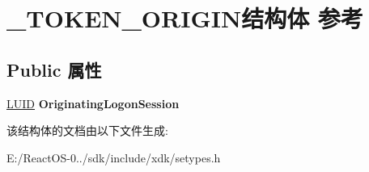 \hypertarget{struct___t_o_k_e_n___o_r_i_g_i_n}{}\section{\+\_\+\+T\+O\+K\+E\+N\+\_\+\+O\+R\+I\+G\+I\+N结构体 参考}
\label{struct___t_o_k_e_n___o_r_i_g_i_n}
\subsection*{Public 属性}
\begin{DoxyCompactItemize}
\item 
\mbox{\label{struct___t_o_k_e_n___o_r_i_g_i_n_aeb34d0de08e1b549b667937b1575209f}} 
\hyperlink{struct___l_u_i_d}{L\+U\+ID} {\bfseries Originating\+Logon\+Session}
\end{DoxyCompactItemize}


该结构体的文档由以下文件生成\+:\begin{DoxyCompactItemize}
\item 
E\+:/\+React\+O\+S-\/0../sdk/include/xdk/setypes.\+h\end{DoxyCompactItemize}
